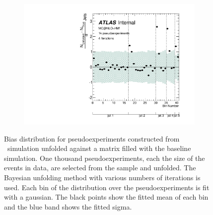 \begin{figure}
\begin{subfigure}[]{0.5\textwidth}
\end{subfigure}
\begin{subfigure}[]{0.5\textwidth}
\includegraphics[width=\textwidth]{fig/Stress/105200atlfast/Pull4Iterations.pdf}
\end{subfigure}
\caption{Bias distribution for pseudoexperiments constructed from \mcnlohw\ simulation unfolded against a matrix filled with the baseline simulation. One thousand pseudoexperiments, each the size of the events in data, are selected from the sample and unfolded. The Bayesian unfolding method with various numbers of iterations is used. Each bin of the distribution over the pseudoexperiments is fit with a gaussian. The black points show the fitted mean of each bin and the blue band shows the fitted sigma.}
\label{fig:mcnlopull}
\end{figure}
\clearpage
